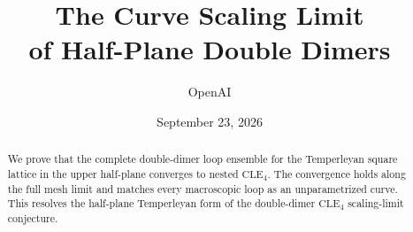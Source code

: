 \documentclass[11pt]{article}
\title{The Curve Scaling Limit\\of Half-Plane Double Dimers}
\author{OpenAI}
\date{September 23, 2026}
\theoremstyle{definition}
\theoremstyle{remark}
\newcommand{\CLE}{\mathrm{CLE}}
\newcommand{\1}{\mathbf 1}
\begin{document}
\maketitle
\begin{abstract}
We prove that the complete double-dimer loop ensemble for the Temperleyan
square lattice in the upper half-plane converges to nested \(\CLE_4\).
The convergence holds along the full mesh limit and matches every macroscopic
loop as an unparametrized curve. This resolves the half-plane Temperleyan form
of the double-dimer \(\CLE_4\) scaling-limit conjecture.
\end{abstract}







\end{document}
